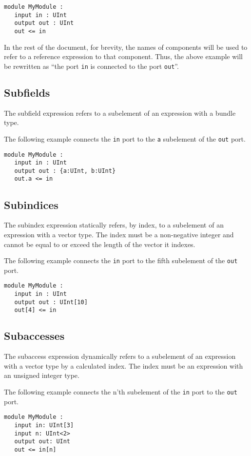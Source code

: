 \documentclass[12pt]{article}
\begin{document}
\begin{verbatim}
module MyModule :
   input in : UInt
   output out : UInt
   out <= in
\end{verbatim}

In the rest of the document, for brevity, the names of components will be used to refer to a reference expression to that component. Thus, the above example will be rewritten as ``the port \verb|in| is connected to the port \verb|out|''.

\subsection{Subfields}
The subfield expression refers to a subelement of an expression with a bundle type.

The following example connects the \verb|in| port to the \verb|a| subelement of the \verb|out| port. 
\begin{verbatim}
module MyModule :
   input in : UInt
   output out : {a:UInt, b:UInt}
   out.a <= in
\end{verbatim}

\subsection{Subindices}
The subindex expression statically refers, by index, to a subelement of an expression with a vector type. The index must be a non-negative integer and cannot be equal to or exceed the length of the vector it indexes.

The following example connects the \verb|in| port to the fifth subelement of the \verb|out| port. 
\begin{verbatim}
module MyModule :
   input in : UInt
   output out : UInt[10]
   out[4] <= in
\end{verbatim}

\subsection{Subaccesses}
The subaccess expression dynamically refers to a subelement of an expression with a vector type by a calculated index. The index must be an expression with an unsigned integer type.

The following example connects the n'th subelement of the \verb|in| port to the \verb|out| port.
\begin{verbatim}
module MyModule :
   input in: UInt[3]
   input n: UInt<2>
   output out: UInt
   out <= in[n]
\end{verbatim}
\end{document}
